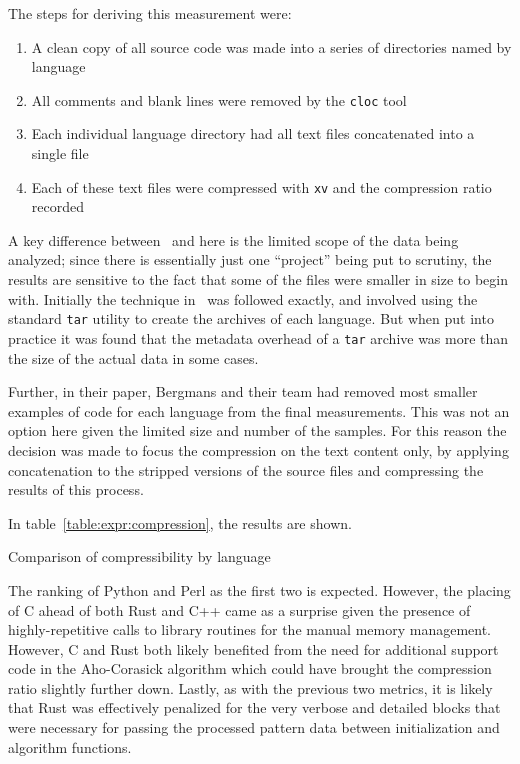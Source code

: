 The steps for deriving this measurement were:

\begin{enumerate}
\item A clean copy of all source code was made into a series of directories named by language
\item All comments and blank lines were removed by the \texttt{cloc} tool
\item Each individual language directory had all text files concatenated into a single file
\item Each of these text files were compressed with \texttt{xv} and the compression ratio recorded
\end{enumerate}

A key difference between~\cite{bergmans} and here is the limited scope of the data being analyzed; since there is essentially just one ``project'' being put to scrutiny, the results are sensitive to the fact that some of the files were smaller in size to begin with. Initially the technique in~\cite{bergmans} was followed exactly, and involved using the standard \texttt{tar} utility to create the archives of each language. But when put into practice it was found that the metadata overhead of a \texttt{tar} archive was more than the size of the actual data in some cases.

Further, in their paper, Bergmans and their team had removed most smaller examples of code for each language from the final measurements. This was not an option here given the limited size and number of the samples. For this reason the decision was made to focus the compression on the text content only, by applying concatenation to the stripped versions of the source files and compressing the results of this process.

In table~\ref{table:expr:compression}, the results are shown.

\begin{table}[!htb]

\caption{Comparison of compressibility by language}
\label{table:expr:compression}
\end{table}

The ranking of Python and Perl as the first two is expected. However, the placing of C ahead of both Rust and C++ came as a surprise given the presence of highly-repetitive calls to library routines for the manual memory management. However, C and Rust both likely benefited from the need for additional support code in the Aho-Corasick algorithm which could have brought the compression ratio slightly further down. Lastly, as with the previous two metrics, it is likely that Rust was effectively penalized for the very verbose and detailed blocks that were necessary for passing the processed pattern data between initialization and algorithm functions.

